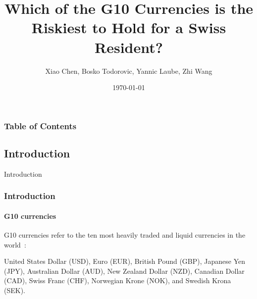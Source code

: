 \documentclass[10pt]{beamer}
\author{Xiao Chen, Bosko Todorovic, Yannic Laube, Zhi Wang}
\title{Which of the G10 Currencies is the Riskiest to Hold for a Swiss Resident?}
\institute{University of Zurich}
\date{\today}
\begin{document}
\begin{frame}
\titlepage
\end{frame}
\begin{frame}
\frametitle{Table of Contents}
\tableofcontents
\end{frame}
\begin{frame}
\section{Introduction}
\centering \LARGE Introduction
\end{frame}
\begin{frame}
\frametitle{Introduction}
\framesubtitle{G10 currencies}
G10 currencies refer to the ten most heavily traded and liquid currencies in the world~\cite{bis2022report}: 

United States Dollar (USD), Euro (EUR), British Pound (GBP), Japanese Yen (JPY), Australian Dollar (AUD), New Zealand Dollar (NZD), Canadian Dollar (CAD), Swiss Franc (CHF), Norwegian Krone (NOK), and Swedish Krona (SEK).

\end{frame}
\end{document}
